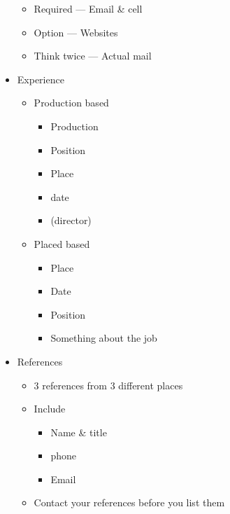 \documentclass[12pt]{article}
\begin{document}
\begin{itemize}
\begin{itemize}
                    \item Required --- Email \& cell
                    \item Option --- Websites
                    \item Think twice --- Actual mail
                \end{itemize}
                \item Experience
                \begin{itemize}
                    \item Production based
                    \begin{itemize}
                        \item Production
                        \item Position
                        \item Place
                        \item date
                        \item (director)
                    \end{itemize}
                    \item Placed based
                    \begin{itemize}
                        \item Place
                        \item Date
                        \item Position
                        \item Something about the job
                    \end{itemize}
                \end{itemize}
                \item References
                \begin{itemize}
                    \item 3 references from 3 different places
                    \item Include
                    \begin{itemize}
                        \item Name \& title
                        \item phone
                        \item Email
                    \end{itemize}
                    \item Contact your references before you list them
                \end{itemize}

\end{itemize}
\end{document}
